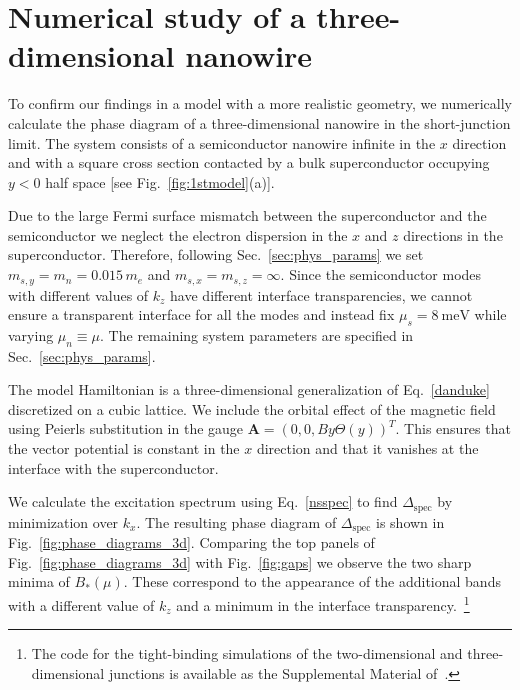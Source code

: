 \section{Numerical study of a three-dimensional nanowire}
\label{sec:3d}

To confirm our findings in a model with a more realistic geometry, we numerically calculate the phase diagram of a three-dimensional nanowire in the short-junction limit.
The system consists of a semiconductor nanowire infinite in the $x$ direction and with a square cross section contacted by a bulk superconductor occupying $y<0$ half space  [see Fig.~\ref{fig:1stmodel}(a)].

Due to the large Fermi surface mismatch between the superconductor and the semiconductor we neglect the electron dispersion in the $x$ and $z$ directions in the superconductor.
Therefore, following Sec.~\ref{sec:phys_params} we set $m_{s,y} = m_n= 0.015\, m_e$ and $m_{s,x} = m_{s, z} = \infty$.
Since the semiconductor modes with different values of $k_z$ have different interface transparencies, we cannot ensure a transparent interface for all the modes and instead fix $\mu_s=\SI{8}{\meV}$ while varying $\mu_n\equiv\mu$.
The remaining system parameters are specified in Sec.~\ref{sec:phys_params}.

The model Hamiltonian is a three-dimensional generalization of Eq.~\eqref{danduke} discretized on a cubic lattice.
We include the orbital effect of the magnetic field using Peierls substitution in the gauge $\bm A={\left( 0, 0, B y\Theta(y) \right)}^{T}$.
This ensures that the vector potential is constant in the $x$ direction and that it vanishes at the interface with the superconductor.

We calculate the excitation spectrum using Eq.~\eqref{nsspec} to find $\Delta_\mathrm{spec}$ by minimization over $k_x$.
The resulting phase diagram of $\Delta_\mathrm{spec}$ is shown in Fig.~\ref{fig:phase_diagrams_3d}.
Comparing the top panels of Fig.~\ref{fig:phase_diagrams_3d} with Fig.~\ref{fig:gaps} we observe the two sharp minima of $B_*(\mu)$.
These correspond to the appearance of the additional bands with a different value of $k_z$ and a minimum in the interface transparency.~\footnote{The code for the tight-binding simulations of the two-dimensional and three-dimensional junctions is available as the Supplemental Material of~\cite{Sticlet2017}.}

